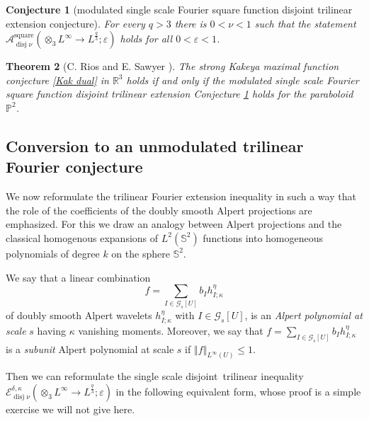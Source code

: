 \documentclass{amsart}%
\newtheorem{theorem}{Theorem}
\theoremstyle{plain}
\newtheorem{conjecture}[theorem]{Conjecture}
\numberwithin{equation}{section}
\begin{document}
\begin{conjecture}
[modulated single scale Fourier square function disjoint trilinear extension
conjecture]\label{ssFsftec}For every $q>3$ there is $0<\nu<1$ such that the
statement $\mathcal{A}_{\operatorname*{disj}\nu}^{\operatorname*{square}%
}\left(  \otimes_{3}L^{\infty}\rightarrow L^{\frac{q}{3}};\varepsilon\right)
$ holds for all $0<\varepsilon<1$.
\end{conjecture}

\begin{theorem}
[C. Rios and E. Sawyer \cite{RiSa2}]\label{SFA}The strong Kakeya maximal
function conjecture \ref{Kak dual} in $\mathbb{R}^{3}$ holds \emph{if and only
if} the modulated single scale Fourier square function disjoint trilinear
extension Conjecture \ref{ssFsftec} holds for the paraboloid $\mathbb{P}^{2}$.
\end{theorem}

\subsection{Conversion to an unmodulated trilinear Fourier conjecture}

We now reformulate the trilinear Fourier extension inequality in such a way
that the role of the coefficients of the doubly smooth Alpert projections are
emphasized. For this we draw an analogy between Alpert projections and the
classical homogenous expansions of $L^{2}\left(  \mathbb{S}^{2}\right)  $
functions into homogeneous polynomials of degree $k$ on the sphere
$\mathbb{S}^{2}$.

We say that a linear combination
\[
f=\sum_{I\in\mathcal{G}_{s}\left[  U\right]  }b_{I}h_{I;\kappa}^{\eta}%
\]
of doubly smooth Alpert wavelets $h_{I;\kappa}^{\eta}$ with $I\in
\mathcal{G}_{s}\left[  U\right]  $, is an \emph{Alpert polynomial at scale
}$s$ having $\kappa$ vanishing moments. Moreover, we say that $f=\sum
_{I\in\mathcal{G}_{s}\left[  U\right]  }b_{I}h_{I;\kappa}^{\eta}$ is a
\emph{subunit} Alpert polynomial at scale $s$ if $\left\Vert f\right\Vert
_{L^{\infty}\left(  U\right)  }\leq1$.

Then we can reformulate the single scale disjoint\emph{\ }trilinear inequality
$\mathcal{E}_{\operatorname*{disj}\nu}^{\delta,\kappa}\left(  \otimes
_{3}L^{\infty}\rightarrow L^{\frac{q}{3}};\varepsilon\right)  $ in the
following equivalent form, whose proof is a simple exercise we will not give here.
\end{document}
